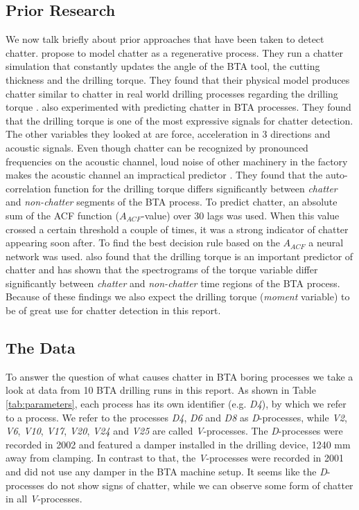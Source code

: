 \documentclass[12 pt]{scrartcl}
\begin{document}
\subsection{Prior Research}

We now talk briefly about prior approaches that have been taken to detect chatter. \citet{raabe2010dynamic} propose to model chatter as a regenerative process. They run a chatter simulation that constantly updates the angle of the BTA tool, the cutting thickness and the drilling torque. They found that their physical model produces chatter similar to chatter in real world drilling processes regarding the drilling torque \citep[p.~748]{raabe2010dynamic}.
\citet{weinert2001statistics} also experimented with predicting chatter in BTA processes. They found that the drilling torque is one of the most expressive signals for chatter detection. The other variables they looked at are force, acceleration in 3 directions and acoustic signals. Even though chatter can be recognized by pronounced frequencies on the acoustic channel, loud noise of other machinery in the factory makes the acoustic channel an impractical predictor \citep[p.~6]{weinert2001statistics}. They found that the auto-correlation function for the drilling torque differs significantly between \emph{chatter} and \emph{non-chatter} segments of the BTA process.
To predict chatter, an absolute sum of the ACF function ($A_{ACF}$-value) over 30 lags was used. When this value crossed a certain threshold a couple of times, it was a strong indicator of chatter appearing soon after. To find the best decision rule based on the $A_{ACF}$ a neural network was used.
\citet[p.~27]{theis2004modelling} also found that the drilling torque is an important predictor of chatter and has shown that the spectrograms of the torque variable differ significantly between \emph{chatter} and \emph{non-chatter} time regions of the BTA process.
Because of these findings we also expect the drilling torque (\emph{moment} variable) to be of great use for chatter detection in this report.

\subsection{The Data}

To answer the question of what causes chatter in BTA boring processes we take a look at data from 10 BTA drilling runs in this report.
As shown in Table \ref{tab:parameters}, each process has its own identifier (e.g. \emph{D4}), by which we refer to a process.
We refer to the processes \emph{D4}, \emph{D6} and \emph{D8} as \emph{D}-processes, while \emph{V2}, \emph{V6}, \emph{V10}, \emph{V17}, \emph{V20}, \emph{V24} and \emph{V25} are called \emph{V}-processes.
The \emph{D}-processes were recorded in 2002 and featured a damper installed in the drilling device, 1240 mm away from clamping. In contrast to that, the \emph{V}-processes were recorded in 2001 and did not use any damper in the BTA machine setup. It seems like the \emph{D}-processes do not show signs of chatter, while we can observe some form of chatter in all \emph{V}-processes.
\end{document}
